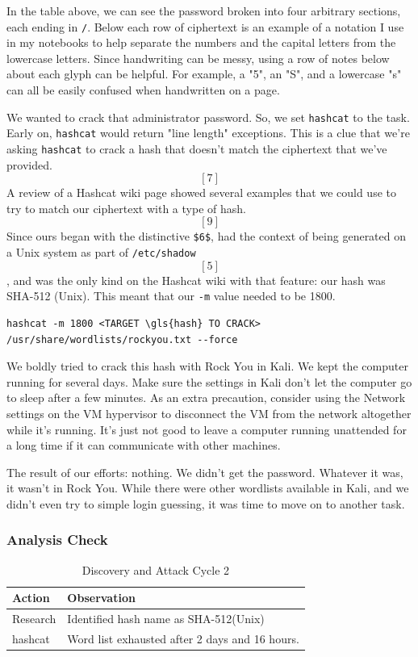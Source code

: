 In the table above, we can see the password broken into four arbitrary sections, each ending in \texttt{/}.  Below each row of ciphertext is an example of a notation I use in my notebooks to help separate the numbers and the capital letters from the lowercase letters.  Since handwriting can be messy, using a row of notes below about each glyph can be helpful.  For example, a "5", an "S", and a lowercase "s" can all be easily confused when handwritten on a page. 

We wanted to crack that administrator password.  So, we set \texttt{hashcat} to the task.  Early on, \texttt{hashcat} would return "line length" exceptions.  This is a clue that we're asking \texttt{hashcat} to crack a hash that doesn't match the ciphertext that we've provided. \[[7]\]  A review of a Hashcat wiki page showed several examples that we could use to try to match our ciphertext with a type of hash. \[[9]\]  Since ours began with the distinctive \texttt{\$6\$}, had the context of being generated on a Unix system as part of \texttt{/etc/shadow}\[[5]\], and was the only kind on the Hashcat wiki with that feature:  our hash was SHA-512 (Unix).  This meant that our \texttt{-m} value needed to be 1800.  

\begin{lstlisting}
hashcat -m 1800 <TARGET \gls{hash} TO CRACK> /usr/share/wordlists/rockyou.txt --force
\end{lstlisting}

We boldly tried to crack this hash with Rock You in Kali.  We kept the computer running for several days.  Make sure the settings in Kali don't let the computer go to sleep after a few minutes.  As an extra precaution, consider using the Network settings on the VM hypervisor to disconnect the VM from the network altogether while it's running.  It's just not good to leave a computer running unattended for a long time if it can communicate with other machines.  


The result of our efforts:  nothing.  We didn't get the password.  Whatever it was, it wasn't in Rock You.  While there were other wordlists available in Kali, and we didn't even try to simple login guessing, it was time to move on to another task.  

\subsubsection{Analysis Check}
\begin{table}[H]
\caption{Discovery and Attack Cycle 2}
\centering
\begin{tabular}{|l|l|}
\hline
Action & Observation \\
\hline
Research & Identified hash name as SHA-512(Unix) \\
hashcat & Word list exhausted after 2 days and 16 hours. \\
\hline
\end{tabular}
\end{table}

